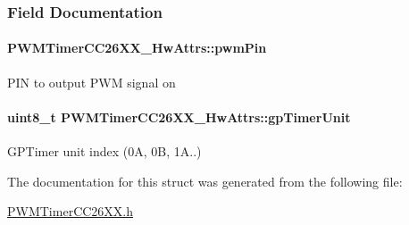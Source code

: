 \subsubsection{Field Documentation}
\paragraph[{pwm\+Pin}]{ P\+W\+M\+Timer\+C\+C26\+X\+X\+\_\+\+Hw\+Attrs\+::pwm\+Pin}\label{struct_p_w_m_timer_c_c26_x_x___hw_attrs_a51bf646e2e56d0dbe1c3b79af314af08}
P\+I\+N to output P\+W\+M signal on 
\paragraph[{gp\+Timer\+Unit}]{\setlength{\rightskip}{0pt plus 5cm}uint8\+\_\+t P\+W\+M\+Timer\+C\+C26\+X\+X\+\_\+\+Hw\+Attrs\+::gp\+Timer\+Unit}\label{struct_p_w_m_timer_c_c26_x_x___hw_attrs_a82c34a1970bf960c04b72f28ecebe1c8}
G\+P\+Timer unit index (0\+A, 0\+B, 1\+A..) 

The documentation for this struct was generated from the following file\+:\begin{DoxyCompactItemize}
\item 
\hyperlink{_p_w_m_timer_c_c26_x_x_8h}{P\+W\+M\+Timer\+C\+C26\+X\+X.\+h}\end{DoxyCompactItemize}
